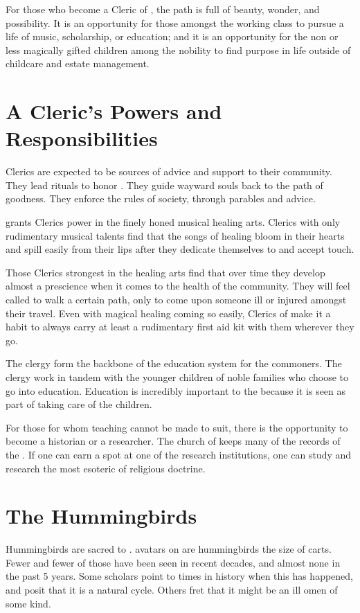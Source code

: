 \documentclass[blue]{GL2020}
\begin{document}
\name{\bCoSCleric{}}

For those who become a Cleric of \cFarmGod{}, the path is full of beauty, wonder, and possibility.  It is an opportunity for those amongst the working class to pursue a life of music, scholarship, or education; and it is an opportunity for the non or less magically gifted children among the nobility to find purpose in life outside of childcare and estate management.

\section{A Cleric's Powers and Responsibilities}
Clerics are expected to be sources of advice and support to their community. They lead rituals to honor \cFarmGod{}. They guide wayward souls back to the path of goodness. They enforce the rules of society, through parables and advice.

\cFarmGod{} grants \cFarmGod{\their} Clerics power in the finely honed musical healing arts.  \pFarm{} Clerics with only rudimentary musical talents find that the songs of healing bloom in their hearts and spill easily from their lips after they dedicate themselves to \cFarmGod{} and accept \cFarmGod{\their} touch.

Those Clerics strongest in the healing arts find that over time they develop almost a prescience when it comes to the health of the community.  They will feel called to walk a certain path, only to come upon someone ill or injured amongst their travel.  Even with magical healing coming so easily, Clerics of \cFarmGod{} make it a habit to always carry at least a rudimentary first aid kit with them wherever they go.

The clergy form the backbone of the \pFarm{} education system for the commoners. The clergy work in tandem with the younger children of noble families who choose to go into education. Education is incredibly important to the \pFarm{} because it is seen as part of taking care of the children.

For those for whom teaching cannot be made to suit, there is the opportunity to become a historian or a researcher. The church of \cFarmGod{} keeps many of the records of the \pFarm{}. If one can earn a spot at one of the research institutions, one can study and research the most esoteric of religious doctrine.

\section*{The Hummingbirds}
Hummingbirds are sacred to \cFarmGod{}. \cFarmGod{\Their} avatars on \pEarth{} are hummingbirds the size of carts. Fewer and fewer of those have been seen in recent decades, and almost none in the past 5 years. Some scholars point to times in history when this has happened, and posit that it is a natural cycle. Others fret that it might be an ill omen of some kind.
\end{document}
